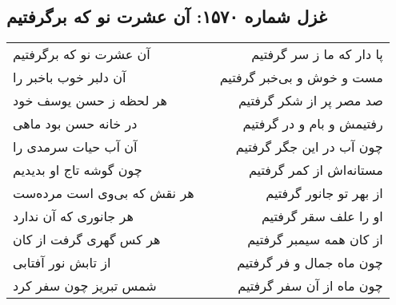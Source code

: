 \begin{center}
\section*{غزل شماره ۱۵۷۰: آن عشرت نو که برگرفتیم}
\label{sec:1570}
\begin{longtable}{l p{0.5cm} r}
آن عشرت نو که برگرفتیم
&&
پا دار که ما ز سر گرفتیم
\\
آن دلبر خوب باخبر را
&&
مست و خوش و بی‌خبر گرفتیم
\\
هر لحظه ز حسن یوسف خود
&&
صد مصر پر از شکر گرفتیم
\\
در خانه حسن بود ماهی
&&
رفتیمش و بام و در گرفتیم
\\
آن آب حیات سرمدی را
&&
چون آب در این جگر گرفتیم
\\
چون گوشه تاج او بدیدیم
&&
مستانه‌اش از کمر گرفتیم
\\
هر نقش که بی‌وی است مرده‌ست
&&
از بهر تو جانور گرفتیم
\\
هر جانوری که آن ندارد
&&
او را علف سقر گرفتیم
\\
هر کس گهری گرفت از کان
&&
از کان همه سیمبر گرفتیم
\\
از تابش نور آفتابی
&&
چون ماه جمال و فر گرفتیم
\\
شمس تبریز چون سفر کرد
&&
چون ماه از آن سفر گرفتیم
\\
\end{longtable}
\end{center}
